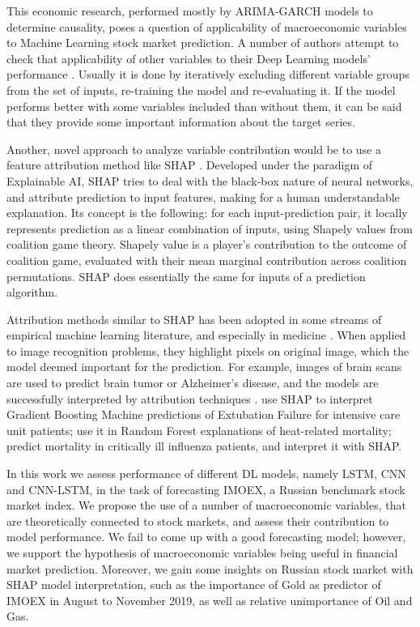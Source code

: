\documentclass[review, authoryear]{elsarticle}
\begin{document}
This economic research, performed mostly by ARIMA-GARCH models to determine causality, poses a question of applicability of macroeconomic variables to Machine Learning stock market prediction. 
A number of authors attempt to check that applicability of other variables to their Deep Learning models' performance \citep{oriani_evaluating_2016, vargas_deep_2018}. Usually it is done by iteratively excluding different variable groups from the set of inputs, re-training the model and re-evaluating it. If the model performs better with some variables included than without them, it can be said that they provide some important information about the target series.

Another, novel approach to analyze variable contribution would be to use a feature attribution method like SHAP \citep{lundberg_unified_2017}. Developed under the paradigm of Explainable AI, SHAP tries to deal with the black-box nature of neural networks, and attribute prediction to input features, making for a human understandable explanation.
Its concept is the following: for each input-prediction pair, it locally represents prediction as a linear combination of inputs, using Shapely values from coalition game theory. Shapely value is a player's contribution to the outcome of coalition game, evaluated with their mean marginal contribution across coalition permutations. SHAP does essentially the same for inputs of a prediction algorithm.

Attribution methods similar to SHAP has been adopted in some streams of empirical machine learning literature, and especially in medicine \citep{singh_explainable_2020}. When applied to image recognition problems, they highlight pixels on original image, which the model deemed important for the prediction. For example, images of brain scans are used to predict brain tumor or Alzheimer’s disease, and the models are successfully interpreted by attribution techniques \citep{eitel_promises_2021, pereira_automatic_2018}.
\cite{chen_prediction_2019} use SHAP to interpret Gradient Boosting Machine predictions of Extubation Failure for intensive care unit patients; \cite{kim_explainable_2022} use it in Random Forest explanations of heat-related mortality; \cite{hu_predicting_2018} predict mortality in critically ill influenza patients, and interpret it with SHAP.

In this work we assess performance of different DL models, namely LSTM, CNN and CNN-LSTM, in the task of forecasting IMOEX, a Russian benchmark stock market index. We propose the use of a number of macroeconomic variables, that are theoretically connected to stock markets, and assess their contribution to model performance. We fail to come up with a good forecasting model; however, we support the hypothesis of macroeconomic variables being useful in financial market prediction. Moreover, we gain some insights on Russian stock market with SHAP model interpretation, such as the importance of Gold as predictor of IMOEX in August to November 2019, as well as relative unimportance of Oil and Gas.
\end{document}
